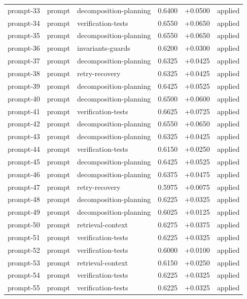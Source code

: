 \begin{center}
\begin{longtable}{llp{5.2cm}rrl}
prompt-33 & prompt & decomposition-planning & 0.6400 & +0.0500 & applied \\
prompt-34 & prompt & verification-tests & 0.6550 & +0.0650 & applied \\
prompt-35 & prompt & decomposition-planning & 0.6550 & +0.0650 & applied \\
prompt-36 & prompt & invariants-guards & 0.6200 & +0.0300 & applied \\
prompt-37 & prompt & decomposition-planning & 0.6325 & +0.0425 & applied \\
prompt-38 & prompt & retry-recovery & 0.6325 & +0.0425 & applied \\
prompt-39 & prompt & decomposition-planning & 0.6425 & +0.0525 & applied \\
prompt-40 & prompt & decomposition-planning & 0.6500 & +0.0600 & applied \\
prompt-41 & prompt & verification-tests & 0.6625 & +0.0725 & applied \\
prompt-42 & prompt & decomposition-planning & 0.6550 & +0.0650 & applied \\
prompt-43 & prompt & decomposition-planning & 0.6325 & +0.0425 & applied \\
prompt-44 & prompt & verification-tests & 0.6150 & +0.0250 & applied \\
prompt-45 & prompt & decomposition-planning & 0.6425 & +0.0525 & applied \\
prompt-46 & prompt & decomposition-planning & 0.6375 & +0.0475 & applied \\
prompt-47 & prompt & retry-recovery & 0.5975 & +0.0075 & applied \\
prompt-48 & prompt & decomposition-planning & 0.6225 & +0.0325 & applied \\
prompt-49 & prompt & decomposition-planning & 0.6025 & +0.0125 & applied \\
prompt-50 & prompt & retrieval-context & 0.6275 & +0.0375 & applied \\
prompt-51 & prompt & verification-tests & 0.6225 & +0.0325 & applied \\
prompt-52 & prompt & verification-tests & 0.6000 & +0.0100 & applied \\
prompt-53 & prompt & retrieval-context & 0.6150 & +0.0250 & applied \\
prompt-54 & prompt & verification-tests & 0.6225 & +0.0325 & applied \\
prompt-55 & prompt & verification-tests & 0.6225 & +0.0325 & applied \\

\end{longtable}
\end{center}

